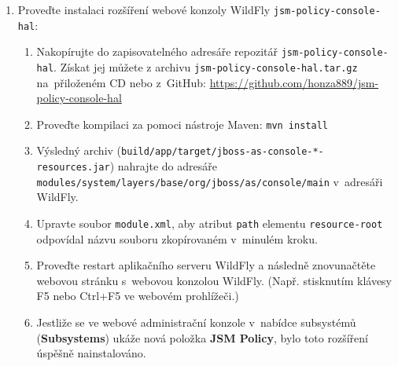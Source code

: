 \begin{enumerate}
  \item Proveďte instalaci rozšíření webové konzoly WildFly {\tt jsm-policy-console-hal}:
  \begin{enumerate}
    \item Nakopírujte do zapisovatelného adresáře repozitář {\tt jsm-policy-console-hal}. Získat jej můžete z archivu {\tt jsm-policy-console-hal.tar.gz} na~přiloženém CD nebo z~GitHub:
      \newline\url{https://github.com/honza889/jsm-policy-console-hal}
    \item Proveďte kompilaci za pomoci nástroje Maven: {\tt mvn install}
    \item Výsledný archiv ({\tt build/app/target/jboss-as-console-*-resources.jar}) nahrajte do adresáře {\tt modules/system/layers/base/org/jboss/as/console/main} v~adresáři WildFly.
    \item Upravte soubor {\tt module.xml}, aby atribut {\tt path} elementu {\tt resource-root} odpovídal názvu souboru zkopírovaném v~minulém kroku.
    \item Proveďte restart aplikačního serveru WildFly a následně znovunačtěte webovou stránku s~webovou konzolou WildFly. (Např. stisknutím klávesy F5 nebo Ctrl+F5 ve webovém prohlížeči.)
    \item Jestliže se ve webové administrační konzole v~nabídce subsystémů ({\bf Subsystems}) ukáže nová položka {\bf JSM Policy}, bylo toto rozšíření úspěšně nainstalováno.
  \end{enumerate}
  
\end{enumerate}


